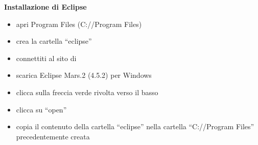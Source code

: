 \documentclass{article}
\begin{document}
\textbf{Installazione di Eclipse}
\begin{itemize}
\item apri Program Files (C://Program Files)
\item crea la cartella ``eclipse''
\item connettiti al sito di \href{https://eclipse.org/downloads/}{}
\item scarica Eclipse Mars.2 (4.5.2) per Windows
\item clicca sulla freccia verde rivolta verso il basso
\item clicca su ``open''
\item copia il contenuto della cartella ``eclipse'' nella cartella ``C://Program Files'' precedentemente creata
\end{itemize}
\end{document}
